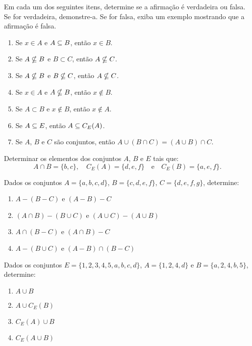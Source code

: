\documentclass[12pt]{exam}
\begin{document}
\questao Em cada um dos seguintes itens, determine se a afirma\c{c}\~ao \'e
verdadeira ou falsa. Se for verdadeira, demonstre-a. Se for falsa, exiba um
exemplo mostrando que a afirma\c{c}\~ao \'e falsa.
\begin{enumerate}[label={\alph*})]
\item Se $x \in A$ e $A \subseteq B$, ent\~ao $x \in B$.

\item Se $A \nsubseteq B$ e $B \subset C$, ent\~ao $A \nsubseteq C$.

\item Se $A \nsubseteq B$ e $B \nsubseteq C$, ent\~ao $A \nsubseteq C$.

\item Se $x \in A$ e $A \nsubseteq B$, ent\~ao $x \notin B$.

\item Se $A \subset B$ e $x \notin B$, ent\~ao $x \notin A$.

\item Se $A \subseteq E$, ent\~ao $A \subseteq C_E(A)$.

\item Se $A$, $B$ e $C$ s\~ao conjuntos, ent\~ao $A \cup (B \cap C) = (A \cup B) \cap C$.
\end{enumerate}

\vspace{.3cm}

\questao Determinar os elementos dos conjuntos $A$, $B$ e $E$ tais que:
\[
	A \cap B = \{b, c\}, \quad C_E(A) = \{d, e, f\} \quad \mbox{e}\quad C_E(B) = \{a, e, f\}.
\]

\vspace{.3cm}

\questao Dados os conjuntos $A = \{a, b, c, d\}$, $B = \{c, d, e, f\}$, $C = \{d, e, f, g\}$, determine:
\begin{enumerate}[label={\alph*})]
	\item $A - (B - C)$ e $(A - B) - C$
	\item $(A \cap B) - (B \cup C)$ e $(A \cup C) - (A \cup B)$
	\item $A \cap (B - C)$ e $(A \cap B) - C$
	\item $A - (B \cup C)$ e $(A - B) \cap (B - C)$
\end{enumerate}

\questao Dados os conjuntos $E = \{1,2,3,4,5,a,b,c,d\}$, $A = \{1,2,4,d\}$ e $B = \{a,2,4,b,5\}$, determine:
\begin{multicols}{2}
	\begin{enumerate}[label={\alph*})]
		\item $A \cup B$
		\item $A \cup C_E(B)$
		\item $C_E(A) \cup B$
		\item $C_E(A \cup B)$
	\end{enumerate}
\end{multicols}
\end{document}

